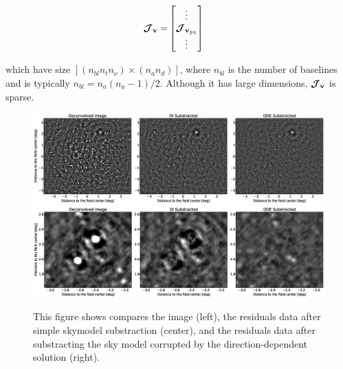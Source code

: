 \begin{alignat}{2}
\label{eq:J}
\bm{\mathcal{J}}_{\textbf{v}}=&
\begin{bmatrix} 
\vdots \\ 
\bm{\mathcal{J}}_{{\textbf{v}_{pq}}}\\ 
\vdots \\ 
\end{bmatrix}
\end{alignat}

\noindent which have size $[(n_{bl} n_t n_{\nu})\times (n_a n_d)]$,
where $n_{bl}$ is the number of baselines and is typically
$n_{bl}=n_a(n_a-1)/2$. Although it has large dimensions, $\bm{\mathcal{J}}_{\textbf{v}}$ is
sparse.


\begin{figure}[ht!]
\begin{center}
\includegraphics[width=17cm]{resid.eps}
\includegraphics[width=17cm]{residZoom.eps}
\caption{\label{fig:resid} This figure shows compares the image
  (left), the residuals data after simple skymodel substraction
  (center), and the residuals data after substracting the
  sky model corrupted by the direction-dependent solution (right).}
\end{center}
\end{figure}

